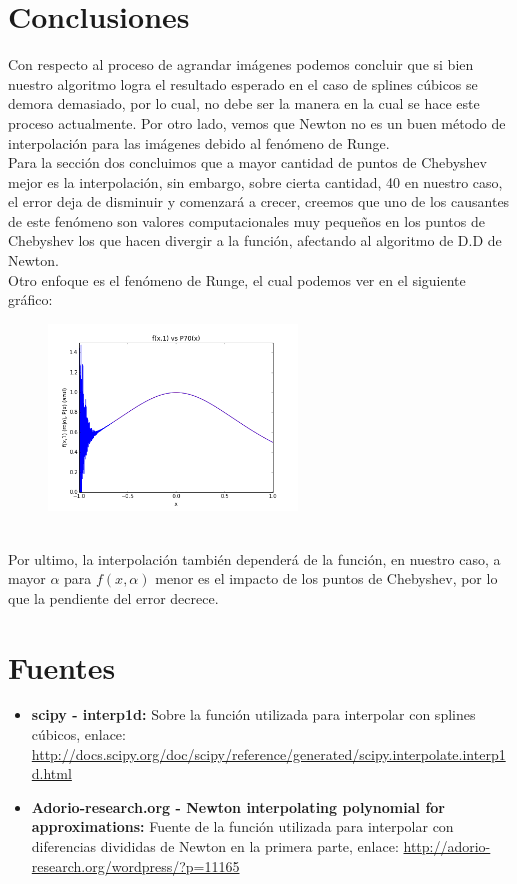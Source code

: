 \documentclass[spanish, fleqn]{article}
\begin{document}
\section{Conclusiones}
	Con respecto al proceso de agrandar imágenes podemos concluir que si bien
	nuestro algoritmo logra el resultado esperado en el caso de splines cúbicos
	se demora demasiado, por lo cual, no debe ser la manera en la cual se hace
	este proceso actualmente. Por otro lado, vemos que Newton no es un buen
	método de interpolación para las imágenes debido al fenómeno de Runge.\\
	Para la sección dos concluimos que a mayor cantidad de puntos de Chebyshev
	mejor es la interpolación, sin embargo, sobre cierta cantidad, 40 en nuestro
	caso, el error deja de disminuir y comenzará a crecer, creemos que uno de 
	los causantes de este fenómeno son valores computacionales muy pequeños en
	los puntos de Chebyshev los que hacen divergir a la función, afectando al
	algoritmo de D.D de Newton.\\
	Otro enfoque es el fenómeno de Runge, el cual podemos ver en el siguiente
	gráfico:
	\begin{figure}[ht!]
		\centering
		\includegraphics[width=250px]{Graficos/Runge.png}
	\end{figure}
	\\Por ultimo, la interpolación también dependerá de la función, en nuestro
	caso, a mayor $\alpha$ para $f(x,\alpha)$ menor es el impacto de los puntos
	de Chebyshev, por lo que la pendiente del error decrece.
\section{Fuentes}
	\begin{itemize}
		\item
			\textbf{scipy - interp1d:} Sobre la función utilizada para
			interpolar con splines cúbicos, enlace: 
			\url{http://docs.scipy.org/doc/scipy/reference/generated/scipy.interpolate.interp1d.html}
		\item
			\textbf{Adorio-research.org - Newton interpolating polynomial for
			approximations:} Fuente de la función utilizada para interpolar
			con diferencias divididas de Newton en la primera parte, enlace:
			\url{http://adorio-research.org/wordpress/?p=11165}
	\end{itemize}
\end{document}

